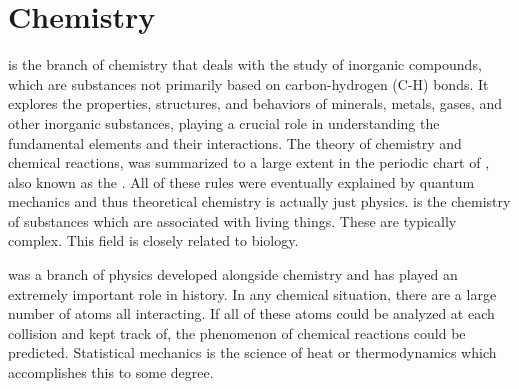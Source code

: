 \section{Chemistry}

 is the branch of chemistry that deals with the study of inorganic compounds, which are substances not primarily based on carbon-hydrogen (C-H) bonds. It explores the properties, structures, and behaviors of minerals, metals, gases, and other inorganic substances, playing a crucial role in understanding the fundamental elements and their interactions. The theory of chemistry and chemical reactions, was summarized to a large extent in the periodic chart of , also known as the . All of these rules were eventually explained by quantum mechanics and thus theoretical chemistry is actually just physics.  is the chemistry of substances which are associated with living things. These are typically complex. This field is closely related to biology.

 was a branch of physics developed alongside chemistry and has played an extremely important role in history. In any chemical situation, there are a large number of atoms all interacting. If all of these atoms could be analyzed at each collision and kept track of, the phenomenon of chemical reactions could be predicted. Statistical mechanics is the science of heat or thermodynamics which accomplishes this to some degree.